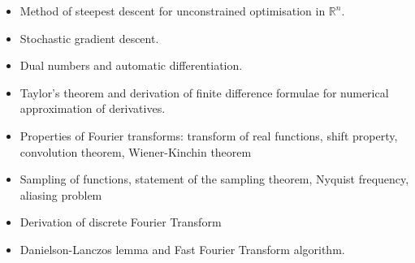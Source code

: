 \documentclass[11pt]{article}
\begin{document}
\begin{multicols}{2}
\begin{itemize}
\item Method of steepest descent for unconstrained optimisation in $\mathbb{R}^n$.
\item Stochastic gradient descent.
\item Dual numbers and automatic differentiation.
\item Taylor's theorem and derivation of finite difference formulae for numerical approximation of derivatives.
\item Properties of Fourier transforms: transform of real functions, shift property, convolution theorem, Wiener-Kinchin theorem  
\item Sampling of functions, statement of the sampling theorem, Nyquist frequency, aliasing problem
\item Derivation of discrete Fourier Transform
\item Danielson-Lanczos lemma and Fast Fourier Transform algorithm.
\end{itemize}


\end{multicols}
\end{document}
